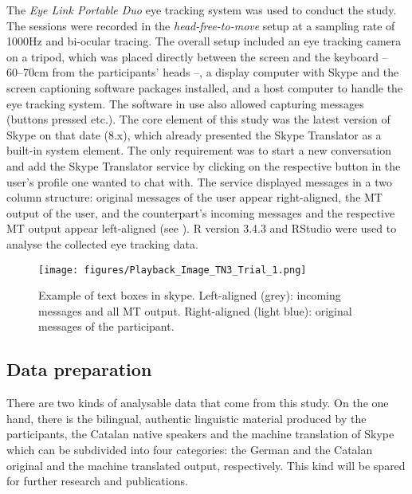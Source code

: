 \documentclass[output=paper]{langscibook}
\begin{document}
The \textit{Eye Link Portable Duo} eye tracking system was used to conduct the study. The sessions were recorded in the \textit{head-free-to-move} setup at a sampling rate of 1000Hz and bi-ocular tracing. The overall setup included an eye tracking camera on a tripod, which was placed directly between the screen and the keyboard -- 60--70cm from the participants' heads --, a display computer with Skype and the screen captioning software packages installed, and a host computer to handle the eye tracking system. The software in use also allowed capturing messages (buttons pressed etc.). 
The core element of this study was the latest version of Skype on that date (8.x), which already presented the Skype Translator as a built-in system element. The only requirement was to start a new conversation and add the Skype Translator service by clicking on the respective button in the user's profile one wanted to chat with. The service displayed messages in a two column structure: original messages of the user appear right-aligned, the MT output of the user, and the counterpart's incoming messages and the respective MT output appear left-aligned (see ).
R version 3.4.3 \citep{r_development_core_team_r_2019} and RStudio were used to analyse the collected eye tracking data.

\begin{figure}
    \texttt{[image: figures/Playback\_Image\_TN3\_Trial\_1.png]}
    \caption{Example of text boxes in skype. Left-aligned (grey): incoming messages and all MT output. Right-aligned (light blue): original messages of the participant.\label{textboxes}}
\end{figure}


\subsection{Data preparation}
\label{subsec:dataprep}
There are two kinds of analysable data that come from this study. On the one hand, there is the bilingual, authentic linguistic material produced by the participants, the Catalan native speakers and the machine translation of Skype which can be subdivided into four categories: the German and the Catalan original and the machine translated output, respectively. This kind will be spared for further research and publications.
\end{document}
